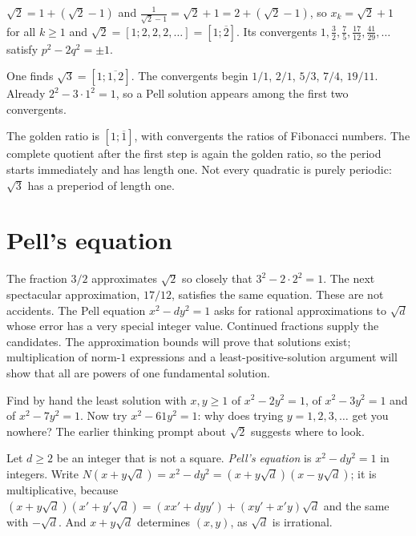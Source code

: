 \begin{example}
$\sqrt2=1+(\sqrt2-1)$ and $\frac1{\sqrt2-1}=\sqrt2+1=2+(\sqrt2-1)$, so $x_k=\sqrt2+1$ for all $k\ge1$ and $\sqrt2=[1;2,2,2,\dots]=[1;\overline2]$. Its convergents $1,\frac32,\frac75,\frac{17}{12},\frac{41}{29},\dots$ satisfy $p^2-2q^2=\pm1$.
\end{example}

\begin{examplex}
One finds $\sqrt 3=[1;\overline{1,2}]$. The convergents begin $1/1$, $2/1$, $5/3$, $7/4$, $19/11$. Already $2^2-3\cdot 1^2=1$, so a Pell solution appears among the first two convergents.
\end{examplex}

\begin{examplex}
The golden ratio is $[1;\overline{1}]$, with convergents the ratios of Fibonacci numbers. The complete quotient after the first step is again the golden ratio, so the period starts immediately and has length one. Not every quadratic is purely periodic: $\sqrt 3$ has a preperiod of length one.
\end{examplex}

\section{Pell's equation}

The fraction $3/2$ approximates $\sqrt2$ so closely that $3^2-2\cdot2^2=1$. The next spectacular approximation, $17/12$, satisfies the same equation. These are not accidents. The Pell equation $x^2-dy^2=1$ asks for rational approximations to $\sqrt d$ whose error has a very special integer value. Continued fractions supply the candidates. The approximation bounds will prove that solutions exist; multiplication of norm-$1$ expressions and a least-positive-solution argument will show that all are powers of one fundamental solution.

\begin{think}
Find by hand the least solution with $x,y\ge1$ of $x^2-2y^2=1$, of $x^2-3y^2=1$ and of $x^2-7y^2=1$. Now try $x^2-61y^2=1$: why does trying $y=1,2,3,\dots$ get you nowhere? The earlier thinking prompt about $\sqrt2$ suggests where to look.
\end{think}

Let $d\ge2$ be an integer that is not a square. \emph{Pell's equation} is $x^2-dy^2=1$ in integers. Write $N(x+y\sqrt d)=x^2-dy^2=(x+y\sqrt d)(x-y\sqrt d)$; it is multiplicative, because $(x+y\sqrt d)(x'+y'\sqrt d)=(xx'+dyy')+(xy'+x'y)\sqrt d$ and the same with $-\sqrt d$. And $x+y\sqrt d$ determines $(x,y)$, as $\sqrt d$ is irrational.

